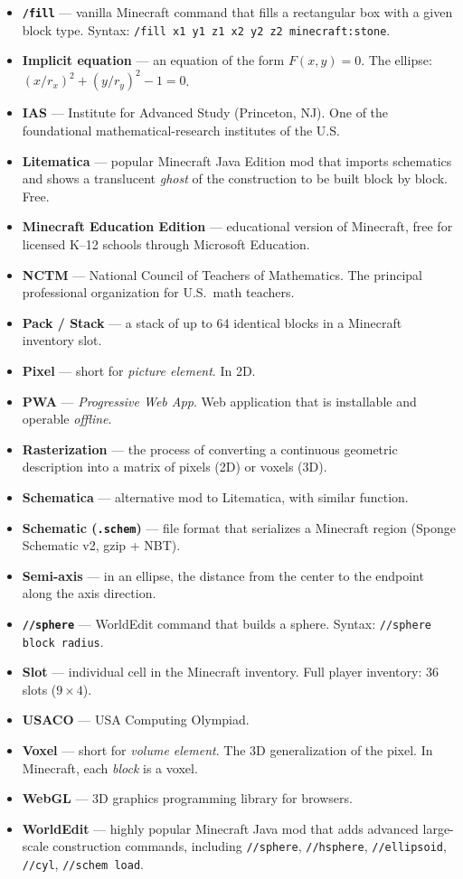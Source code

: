 \documentclass[12pt,a4paper]{scrartcl}
\newcommand{\code}[1]{\texttt{\small #1}}
\newcommand{\acc}[1]{\textcolor{accent}{\textbf{#1}}}
\newcommand{\cmd}[1]{\textcolor{earth}{\texttt{\small #1}}}
\begin{document}
\begin{itemize}[leftmargin=1.4em,itemsep=0.3em,topsep=0.3em]
  \item \acc{\code{/fill}} --- vanilla Minecraft command that fills a rectangular box with a given block type. Syntax: \cmd{/fill x1 y1 z1 x2 y2 z2 minecraft:stone}.
  \item \acc{Implicit equation} --- an equation of the form $F(x, y) = 0$. The ellipse: $(x/r_x)^2 + (y/r_y)^2 - 1 = 0$.
  \item \acc{IAS} --- Institute for Advanced Study (Princeton, NJ). One of the foundational mathematical-research institutes of the U.S.
  \item \acc{Litematica} --- popular Minecraft Java Edition mod that imports schematics and shows a translucent \emph{ghost} of the construction to be built block by block. Free.
  \item \acc{Minecraft Education Edition} --- educational version of Minecraft, free for licensed K--12 schools through Microsoft Education.
  \item \acc{NCTM} --- National Council of Teachers of Mathematics. The principal professional organization for U.S.\ math teachers.
  \item \acc{Pack / Stack} --- a stack of up to 64 identical blocks in a Minecraft inventory slot.
  \item \acc{Pixel} --- short for \emph{picture element}. In 2D.
  \item \acc{PWA} --- \emph{Progressive Web App}. Web application that is installable and operable \emph{offline}.
  \item \acc{Rasterization} --- the process of converting a continuous geometric description into a matrix of pixels (2D) or voxels (3D).
  \item \acc{Schematica} --- alternative mod to Litematica, with similar function.
  \item \acc{Schematic (\texttt{.schem})} --- file format that serializes a Minecraft region (Sponge Schematic v2, gzip + NBT).
  \item \acc{Semi-axis} --- in an ellipse, the distance from the center to the endpoint along the axis direction.
  \item \acc{\code{//sphere}} --- WorldEdit command that builds a sphere. Syntax: \cmd{//sphere block radius}.
  \item \acc{Slot} --- individual cell in the Minecraft inventory. Full player inventory: 36 slots ($9 \times 4$).
  \item \acc{USACO} --- USA Computing Olympiad.
  \item \acc{Voxel} --- short for \emph{volume element}. The 3D generalization of the pixel. In Minecraft, each \emph{block} is a voxel.
  \item \acc{WebGL} --- 3D graphics programming library for browsers.
  \item \acc{WorldEdit} --- highly popular Minecraft Java mod that adds advanced large-scale construction commands, including \cmd{//sphere}, \cmd{//hsphere}, \cmd{//ellipsoid}, \cmd{//cyl}, \cmd{//schem load}.
\end{itemize}
\end{document}
